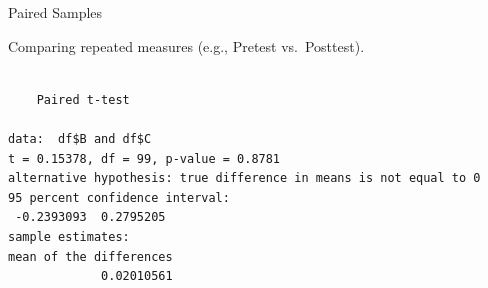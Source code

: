 \begin{frame}[fragile]{Paired Samples}

\center
Comparing repeated measures (e.g., Pretest vs.~Posttest).

\begin{Shaded}
\begin{Highlighting}[]
\OperatorTok{$}\OperatorTok{$} \NormalTok{)}
\end{Highlighting}
\end{Shaded}

\begin{verbatim}

    Paired t-test

data:  df$B and df$C
t = 0.15378, df = 99, p-value = 0.8781
alternative hypothesis: true difference in means is not equal to 0
95 percent confidence interval:
 -0.2393093  0.2795205
sample estimates:
mean of the differences 
             0.02010561 
\end{verbatim}

\end{frame}

